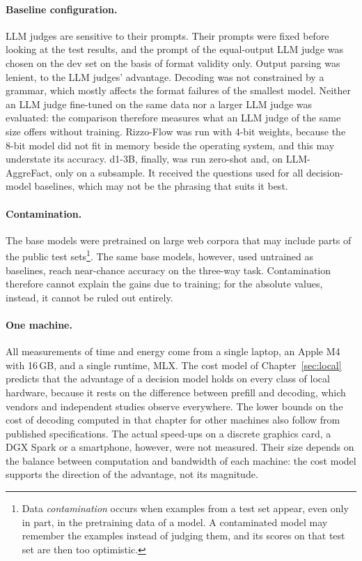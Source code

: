 \paragraph{Baseline configuration.} LLM judges are sensitive to their prompts. Their prompts were fixed before
looking at the test results, and the prompt of the equal-output LLM judge was chosen on the dev set on the basis of format
validity only. Output parsing was lenient, to the LLM judges' advantage. Decoding was not constrained by a grammar, which
mostly affects the format failures of the smallest model. Neither an LLM judge fine-tuned on the same data nor a larger LLM judge
was evaluated: the comparison therefore measures what an LLM judge of the same size offers without training. Rizzo-Flow was
run with 4-bit weights, because the 8-bit model did not fit in memory beside the operating system, and this may
understate its accuracy. d1-3B, finally, was run zero-shot and, on LLM-AggreFact, only on a subsample. It received the
questions used for all decision-model baselines, which may not be the phrasing that suits it best.

\paragraph{Contamination.} The base models were pretrained on large web corpora that may include parts of the public
test sets\footnote{Data \emph{contamination} occurs when examples from a test set appear, even only in part, in the
pretraining data of a model. A contaminated model may remember the examples instead of judging them, and its scores on
that test set are then too optimistic.}. The same base models, however, used untrained as baselines, reach near-chance
accuracy on the three-way task. Contamination therefore cannot explain the gains due to training; for the absolute
values, instead, it cannot be ruled out entirely.

\paragraph{One machine.} All measurements of time and energy come from a single laptop, an Apple M4 with 16\,GB, and a
single runtime, MLX. The cost model of Chapter~\ref{sec:local} predicts that the advantage of a decision model holds on
every class of local hardware, because it rests on the difference between prefill and decoding, which vendors and
independent studies observe everywhere. The lower bounds on the cost of decoding computed in that chapter for other
machines also follow from published specifications. The actual speed-ups on a discrete graphics card, a DGX Spark or a
smartphone, however, were not measured. Their size depends on the balance between computation and bandwidth of each
machine: the cost model supports the direction of the advantage, not its magnitude.

